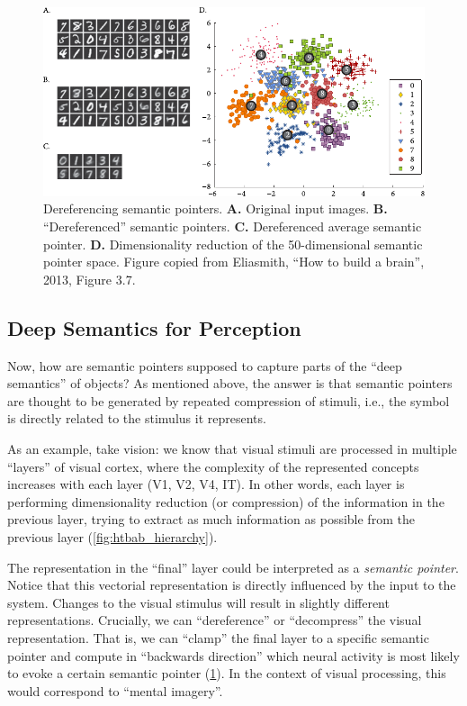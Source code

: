 \documentclass[10pt,letterpaper,oneside]{article}
\begin{document}
\begin{figure}[p]
	\centering
	\includegraphics[scale=1.15]{media/htbab_dereference.pdf}
	\caption{Dereferencing semantic pointers. \textbf{A.} Original input images. \textbf{B.} \enquote{Dereferenced} semantic pointers. \textbf{C.} Dereferenced average semantic pointer. \textbf{D.} Dimensionality reduction of the 50-dimensional semantic pointer space. Figure copied from Eliasmith, \enquote{How to build a brain}, 2013, Figure 3.7.}
	\label{fig:htbab_dereference}
\end{figure}

\subsection{Deep Semantics for Perception}

Now, how are semantic pointers supposed to capture parts of the \enquote{deep semantics} of objects? As mentioned above, the answer is that semantic pointers are thought to be generated by repeated compression of stimuli, i.e., the symbol is directly related to the stimulus it represents.

As an example, take vision: we know that visual stimuli are processed in multiple \enquote{layers} of visual cortex, where the complexity of the represented concepts increases with each layer (V1, V2, V4, IT). In other words, each layer is performing dimensionality reduction (or compression) of the information in the previous layer, trying to extract as much information as possible from the previous layer (\cref{fig:htbab_hierarchy}).

The representation in the \enquote{final} layer could be interpreted as a \emph{semantic pointer}. Notice that this vectorial representation is directly influenced by the input to the system. Changes to the visual stimulus will result in slightly different representations. Crucially, we can \enquote{dereference} or \enquote{decompress} the visual representation. That is, we can \enquote{clamp} the final layer to a specific semantic pointer and compute in \enquote{backwards direction} which neural activity is most likely to evoke a certain semantic pointer (\cref{fig:htbab_dereference}). In the context of visual processing, this would correspond to \enquote{mental imagery}.
\end{document}
